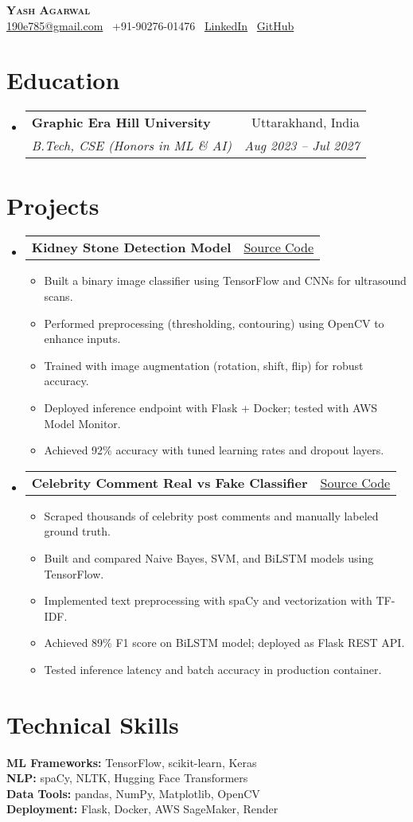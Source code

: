 \documentclass[letterpaper,11pt]{article}
\makeatletter
\newcommand{\resumeItem}[1]{\item\small{#1\vspace{-2pt}}}
\newcommand{\resumeSubheading}[4]{\vspace{-2pt}\item
  \begin{tabular*}{0.97\textwidth}[t]{l@{\extracolsep{\fill}}r}
    \textbf{#1} & #2 \\
    \textit{\small#3} & \textit{\small#4} \\
  \end{tabular*}\vspace{-7pt}}
\newcommand{\resumeProjectHeading}[2]{\item
  \begin{tabular*}{0.97\textwidth}{l@{\extracolsep{\fill}}r}
    \textbf{#1} & \href{#2}{Source Code} \\
  \end{tabular*}\vspace{-5pt}}
\newcommand{\resumeSubHeadingListStart}{\begin{itemize}[leftmargin=0.15in,label={}]}
\newcommand{\resumeSubHeadingListEnd}{\end{itemize}}
\newcommand{\resumeItemListStart}{\begin{itemize}}
\newcommand{\resumeItemListEnd}{\end{itemize}\vspace{-5pt}}
\makeatother
\begin{document}
\begin{center}
  \textbf{\Huge \scshape Yash Agarwal}\\
  \small
  \href{mailto:190e785@gmail.com}{190e785@gmail.com} \textbar\ +91-90276-01476 \textbar\ \href{<LinkedIn_URL>}{LinkedIn} \textbar\ \href{<GitHub_URL>}{GitHub}
\end{center}

\section{Education}
\resumeSubHeadingListStart
  \resumeSubheading
    {Graphic Era Hill University}{Uttarakhand, India}
    {B.Tech, CSE (Honors in ML \& AI)}{Aug 2023 -- Jul 2027}
\resumeSubHeadingListEnd

\section{Projects}
\resumeSubHeadingListStart

  \resumeProjectHeading{Kidney Stone Detection Model}{<Kidney_Stone_Model_URL>}
  \resumeItemListStart
    \resumeItem{Built a binary image classifier using TensorFlow and CNNs for ultrasound scans.}
    \resumeItem{Performed preprocessing (thresholding, contouring) using OpenCV to enhance inputs.}
    \resumeItem{Trained with image augmentation (rotation, shift, flip) for robust accuracy.}
    \resumeItem{Deployed inference endpoint with Flask + Docker; tested with AWS Model Monitor.}
    \resumeItem{Achieved 92\% accuracy with tuned learning rates and dropout layers.}
  \resumeItemListEnd

  \resumeProjectHeading{Celebrity Comment Real vs Fake Classifier}{<Comment_Classifier_URL>}
  \resumeItemListStart
    \resumeItem{Scraped thousands of celebrity post comments and manually labeled ground truth.}
    \resumeItem{Built and compared Naive Bayes, SVM, and BiLSTM models using TensorFlow.}
    \resumeItem{Implemented text preprocessing with spaCy and vectorization with TF-IDF.}
    \resumeItem{Achieved 89\% F1 score on BiLSTM model; deployed as Flask REST API.}
    \resumeItem{Tested inference latency and batch accuracy in production container.}
  \resumeItemListEnd

\resumeSubHeadingListEnd

\section{Technical Skills}
\begin{itemize}[leftmargin=0.15in,label={}]
  \small{\item{
    \textbf{ML Frameworks:} TensorFlow, scikit-learn, Keras\\
    \textbf{NLP:} spaCy, NLTK, Hugging Face Transformers\\
    \textbf{Data Tools:} pandas, NumPy, Matplotlib, OpenCV\\
    \textbf{Deployment:} Flask, Docker, AWS SageMaker, Render
  }}
\end{itemize}
\end{document}

